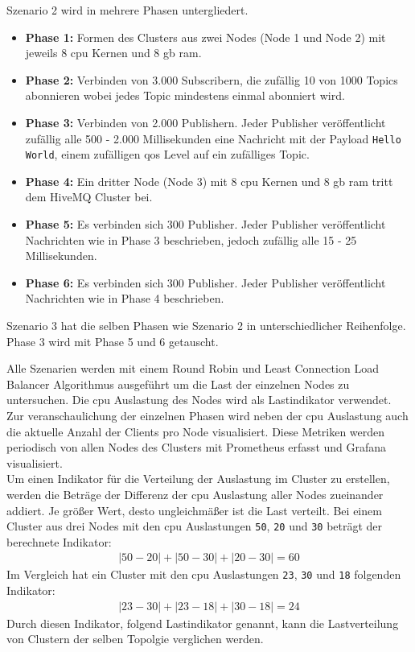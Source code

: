 Szenario 2 wird in mehrere Phasen untergliedert.
\begin{itemize}
  \item \textbf{Phase 1:} Formen des Clusters aus zwei Nodes (Node 1 und Node 2) mit jeweils 8 \ac{cpu} Kernen und 8 \ac{gb} \ac{ram}.
  \item \textbf{Phase 2:} Verbinden von 3.000 Subscribern, die zufällig 10 von 1000 Topics abonnieren wobei jedes Topic mindestens einmal abonniert wird.
  \item \textbf{Phase 3:} Verbinden von 2.000 Publishern. Jeder Publisher veröffentlicht zufällig alle 500 - 2.000 Millisekunden eine Nachricht mit der Payload \verb|Hello World|, einem zufälligen \ac{qos} Level auf ein zufälliges Topic.
  \item \textbf{Phase 4:} Ein dritter Node (Node 3) mit 8 \ac{cpu} Kernen und 8 \ac{gb} \ac{ram} tritt dem HiveMQ Cluster bei.
  \item \textbf{Phase 5:} Es verbinden sich 300 Publisher. Jeder Publisher veröffentlicht Nachrichten wie in Phase 3 beschrieben, jedoch zufällig alle 15 - 25 Millisekunden.
  \item \textbf{Phase 6:} Es verbinden sich 300 Publisher. Jeder Publisher veröffentlicht Nachrichten wie in Phase 4 beschrieben.
\end{itemize}
Szenario 3 hat die selben Phasen wie Szenario 2 in unterschiedlicher Reihenfolge. Phase 3 wird mit Phase 5 und 6 getauscht.

Alle Szenarien werden mit einem Round Robin und Least Connection Load Balancer Algorithmus ausgeführt um die Last der einzelnen Nodes zu untersuchen. Die \ac{cpu} Auslastung des Nodes wird als Lastindikator verwendet. Zur veranschaulichung der einzelnen Phasen wird neben der \ac{cpu} Auslastung auch die aktuelle Anzahl der Clients pro Node visualisiert.
Diese Metriken werden periodisch von allen Nodes des Clusters mit Prometheus erfasst und Grafana visualisiert.
\\
Um einen Indikator für die Verteilung der Auslastung im Cluster zu erstellen, werden die Beträge der Differenz der \ac{cpu} Auslastung aller Nodes zueinander addiert. Je grö{\ss}er Wert, desto ungleichmä{\ss}er ist die Last verteilt.
Bei einem Cluster aus drei Nodes mit den \ac{cpu} Auslastungen \verb|50|, \verb|20| und \verb|30| beträgt der berechnete Indikator:
\begin{align}
   |50 - 20| + |50 - 30| + |20 - 30| = 60
\end{align}
Im Vergleich hat ein Cluster mit den \ac{cpu} Auslastungen \verb|23|, \verb|30| und \verb|18| folgenden Indikator:
\begin{align}
   |23 - 30| + |23 - 18| + |30 - 18| = 24
\end{align}
Durch diesen Indikator, folgend Lastindikator genannt, kann die Lastverteilung von Clustern der selben Topolgie verglichen werden.

